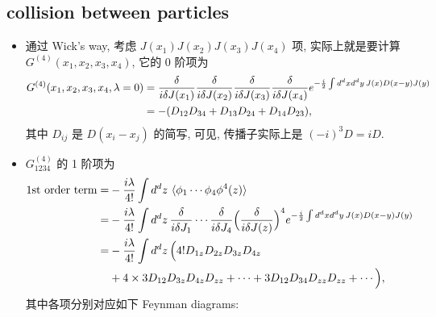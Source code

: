 \subsection{collision between particles}
\begin{itemize}
	\item 通过 Wick's way, 考虑 $J(x_1) J(x_2) J(x_3) J(x_4)$ 项, 实际上就是要计算 $G^{(4)}(x_1, x_2, x_3, x_4)$, 它的 0 阶项为
	\begin{align}
		G^{(4)}(x_1, x_2, x_3, x_4, \lambda = 0) &= \frac{\delta}{i \delta J(x_1)} \frac{\delta}{i \delta J(x_2)} \frac{\delta}{i \delta J(x_3)} \frac{\delta}{i \delta J(x_4)} e^{- \frac{i}{2} \int d^d x d^d y \, J(x) D(x - y) J(y)} \notag \\
		&= - (D_{1 2} D_{3 4} + D_{1 3} D_{2 4} + D_{1 4} D_{2 3}),
	\end{align}
	其中 $D_{i j}$ 是 $D(x_i - x_j)$ 的简写, 可见, 传播子实际上是 $(- i)^3 D = i D$.
	
	\item $G^{(4)}_{1 2 3 4}$ 的 1 阶项为
	\begin{align}
		\text{1st order term} =& - \frac{i \lambda}{4!} \int d^d z \, \braket{\phi_1 \cdots \phi_4 \phi^4(z)} \notag \\
		=& - \frac{i \lambda}{4!} \int d^d z \, \frac{\delta}{i \delta J_1} \cdots \frac{\delta}{i \delta J_4} \Big( \frac{\delta}{i \delta J(z)} \Big)^4 e^{- \frac{i}{2} \int d^d x d^d y \, J(x) D(x - y) J(y)} \notag \\
		=& - \frac{i \lambda}{4!} \int d^d z \, \Big( 4! D_{1 z} D_{2 z} D_{3 z} D_{4 z} \notag \\
		& + 4 \times 3 D_{1 2} D_{3 z} D_{4 z} D_{z z} + \cdots + 3 D_{1 2} D_{3 4} D_{z z} D_{z z} + \cdots \Big),
	\end{align}
	其中各项分别对应如下 Feynman diagrams:
	

\end{itemize}
